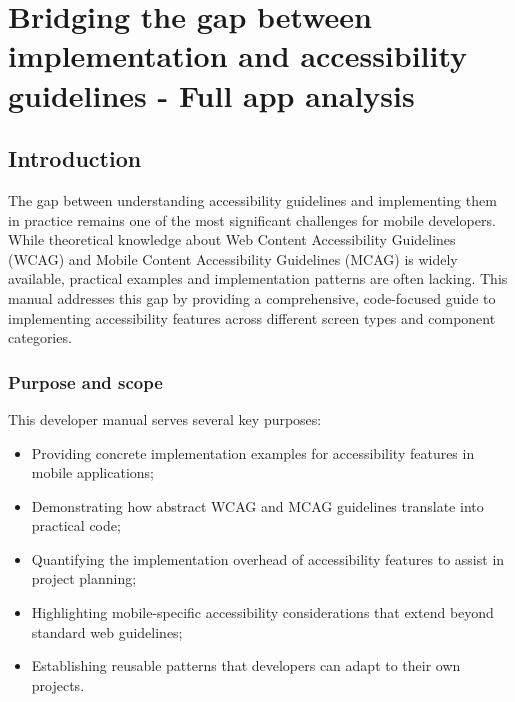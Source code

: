 \chapter{Bridging the gap between implementation and accessibility guidelines - Full app analysis}
\label{chap:accessibility-developer-manual}


\section{Introduction}
\label{sec:dev-intro}

The gap between understanding accessibility guidelines and implementing them in practice remains one of the most significant challenges for mobile developers. While theoretical knowledge about Web Content Accessibility Guidelines (WCAG) and Mobile Content Accessibility Guidelines (MCAG) is widely available, practical examples and implementation patterns are often lacking. This manual addresses this gap by providing a comprehensive, code-focused guide to implementing accessibility features across different screen types and component categories.

\subsection{Purpose and scope}
\label{subsec:dev-purpose}

This developer manual serves several key purposes:

\begin{itemize}
    \item Providing concrete implementation examples for accessibility features in mobile applications;
    
    \item Demonstrating how abstract WCAG and MCAG guidelines translate into practical code;
    
    \item Quantifying the implementation overhead of accessibility features to assist in project planning;
    
    \item Highlighting mobile-specific accessibility considerations that extend beyond standard web guidelines;
    
    \item Establishing reusable patterns that developers can adapt to their own projects.
\end{itemize}

